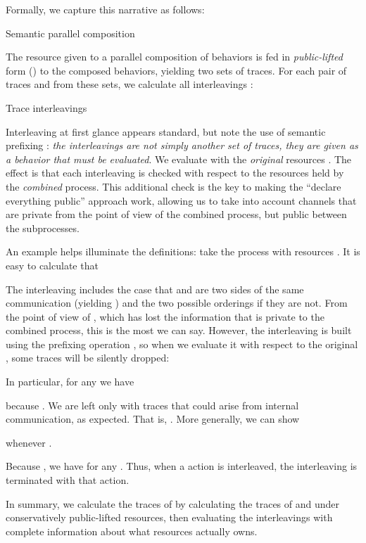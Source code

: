\documentclass{entcs}
\begin{document}
Formally, we capture this narrative as follows: 
\begin{display}
[]
{Semantic parallel composition}

\end{display}
The resource  given to a parallel composition of behaviors is
fed in \emph{public-lifted} form () to the composed
behaviors, yielding two sets of traces.  For each pair of traces 
and  from these sets, we calculate all interleavings
\tparallel:
\begin{display}
[]
{Trace interleavings}

\end{display}
Interleaving at first glance appears standard, but note the use of
semantic prefixing : \emph{the interleavings are not simply
  another set of traces, they are given as a \emph{behavior} that must
  be evaluated}.  We evaluate with the \emph{original} resources
.  The effect is that each interleaving is checked with
respect to the resources held by the \emph{combined} process.  This
additional check is the key to making the ``declare everything
public'' approach work, allowing us to take into account channels that
are private from the point of view of the combined process, but public
between the subprocesses.

An example helps illuminate the definitions: take the process
 with resources .  It is easy to
calculate that

The interleaving  includes the case that  and
 are two sides of the same communication (yielding ) and the two possible orderings if they are not.
From the point of view of , which has lost the
information that  is private to the combined process, this is the
most we can say.  However, the interleaving is built using the
prefixing operation , so when we evaluate it with respect to
the original , some traces will be silently dropped:

In particular, for any  we have 

because .  We are left only with traces that could
arise from internal communication, as expected.  That is, 
.
More generally, we can show 

whenever .

Because , we have  for any .  Thus, when a
 action is interleaved, the interleaving is terminated with
that action.

In summary, we calculate the traces of  by calculating the traces
of  and  under conservatively public-lifted resources, then
evaluating the interleavings with complete information about what
resources  actually owns.
\end{document}
